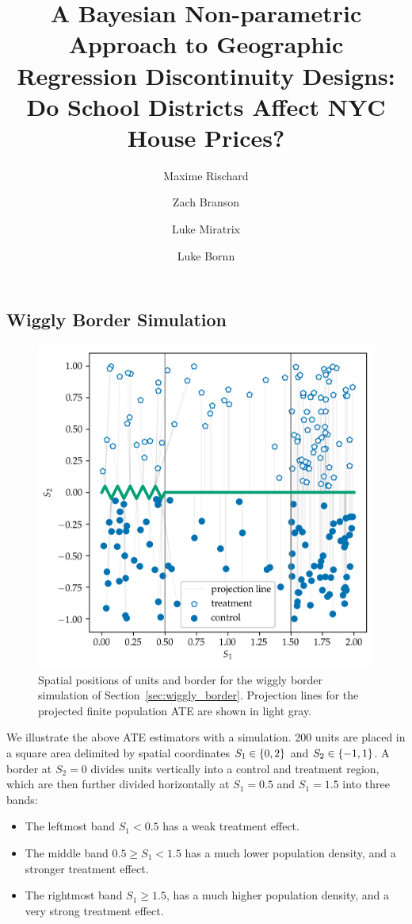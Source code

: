 \documentclass[letter,12pt]{article}
\title{
    A Bayesian Non-parametric Approach to Geographic Regression Discontinuity Designs:
    Do School Districts Affect NYC House Prices?
}
\author[a]{Maxime Rischard}
\author[a]{Zach Branson}
\author[b]{Luke Miratrix}
\author[c]{Luke Bornn}
\affil[a]{Department of Statistics, Harvard University}
\affil[b]{Graduate School of Education, Harvard University}
\affil[c]{Simon Fraser University}
\DeclarePairedDelimiter{\curlybracket}{\lbrace}{\rbrace}
\newcommand{\cbr}[1]{\curlybracket*{#1}}
\begin{document}
        \hypertarget{wiggly-border-simulation}{%
\subsection{Wiggly Border Simulation}\label{wiggly-border-simulation}}

\label{sec:wiggly_border}
    

\begin{figure}[tbp]
\centering
\includegraphics[height=0.35\textheight]{../figures/wiggly_boundaries_setup.png}
\caption{\label{fig:wiggly_boundaries_setup}Spatial positions of units and border for the wiggly border simulation of Section~\ref{sec:wiggly_border}. Projection lines for the projected finite population ATE are shown in light gray.}
\end{figure}
    

        We illustrate the above ATE estimators with a simulation.
200 units are placed in a square area delimited by spatial coordinates \(S_1 \in \cbr{0,2}\) and \(S_2 \in \cbr{-1, 1}\).
A border at \(S_2=0\) divides units vertically into a control and treatment region,
which are then further divided horizontally at \(S_1=0.5\) and \(S_1=1.5\) into three bands:

\begin{itemize}
\item
  The leftmost band \(S_1 < 0.5\) has a weak treatment effect.
\item
  The middle band \(0.5 \ge S_1 < 1.5\) has a much lower population density, and a stronger treatment effect.
\item
  The rightmost band \(S_1 \ge 1.5\), has a much higher population density, and a very strong treatment effect.
\end{itemize}
\end{document}
